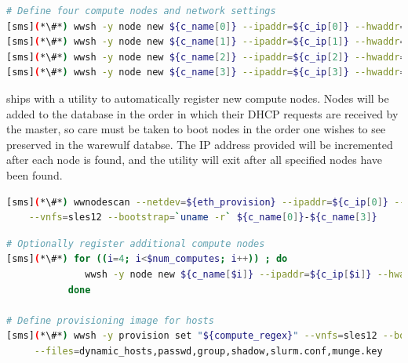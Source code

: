 \documentclass[letterpaper]{article}
\begin{document}



\begin{lstlisting}[language=bash,keywords={},upquote=true,basicstyle=\footnotesize\ttfamily]
# Define four compute nodes and network settings 
[sms](*\#*) wwsh -y node new ${c_name[0]} --ipaddr=${c_ip[0]} --hwaddr=${c_mac[0]} -D ${eth_provision}
[sms](*\#*) wwsh -y node new ${c_name[1]} --ipaddr=${c_ip[1]} --hwaddr=${c_mac[1]} -D ${eth_provision}
[sms](*\#*) wwsh -y node new ${c_name[2]} --ipaddr=${c_ip[2]} --hwaddr=${c_mac[2]} -D ${eth_provision}
[sms](*\#*) wwsh -y node new ${c_name[3]} --ipaddr=${c_ip[3]} --hwaddr=${c_mac[3]} -D ${eth_provision}
\end{lstlisting}

\begin{center}
\begin{tcolorbox}[]
\small
\Warewulf{} ships with a utility to automatically register new compute nodes.
Nodes will be added to the \Warewulf{} database in the order in which their
DHCP requests are received by the master, so care must be taken to boot nodes
in the order one wishes to see preserved in the warewulf databse. The IP
address provided will be incremented after each node is found, and the utility
will exit after all specified nodes have been found.
\begin{lstlisting}[language=bash,keywords={},upquote=true,basicstyle=\footnotesize\ttfamily,]
[sms](*\#*) wwnodescan --netdev=${eth_provision} --ipaddr=${c_ip[0]} --netmask=${internal_netmask} \
    --vnfs=sles12 --bootstrap=`uname -r` ${c_name[0]}-${c_name[3]}
\end{lstlisting}
\end{tcolorbox}
\end{center}

\begin{lstlisting}[language=bash,keywords={},upquote=true,basicstyle=\footnotesize\ttfamily]
# Optionally register additional compute nodes
[sms](*\#*) for ((i=4; i<$num_computes; i++)) ; do
              wwsh -y node new ${c_name[$i]} --ipaddr=${c_ip[$i]} --hwaddr=${c_mac[$i]} -D ${eth_provision}
           done

# Define provisioning image for hosts
[sms](*\#*) wwsh -y provision set "${compute_regex}" --vnfs=sles12 --bootstrap=`uname -r` \
     --files=dynamic_hosts,passwd,group,shadow,slurm.conf,munge.key
\end{lstlisting}
\end{document}
